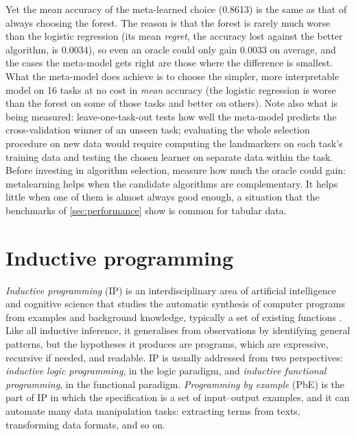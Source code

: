 Yet the mean accuracy of the meta-learned choice (0.8613) is the same as that of always choosing the
forest. The reason is that the forest is rarely much worse than the logistic regression (its
mean \emph{regret}, the accuracy lost against the better algorithm, is 0.0034), so even an oracle could
only gain 0.0033 on average, and the cases the meta-model gets right are those where the difference is
smallest. What the meta-model does achieve is to choose the simpler, more interpretable model on 16
tasks at no cost in \emph{mean} accuracy (the logistic regression is worse than the forest on some of
those tasks and better on others). Note also what is being measured: leave-one-task-out tests how well
the meta-model predicts the cross-validation winner of an unseen task; evaluating the whole selection
procedure on new data would require computing the landmarkers on each task's training data and testing
the chosen learner on separate data within the task. Before investing in algorithm selection, measure how much the oracle
could gain: metalearning helps when the candidate algorithms are complementary. It helps little when one of them
is almost always good enough, a situation that the benchmarks of \cref{sec:performance} show is common
for tabular data.

\section{Inductive programming\extsec}\label{sec:indprog}

\emph{Inductive programming} (IP) is an interdisciplinary area of artificial intelligence and
cognitive science that studies the automatic synthesis of computer programs from examples and
background knowledge, typically a set of existing functions
\citep{kitzelmann2009inductive,gulwani2015inductive}. Like all inductive inference, it generalises from
observations by identifying general patterns, but the hypotheses it produces are programs, which are
expressive, recursive if needed, and readable. IP is usually addressed from two perspectives:
\emph{inductive logic programming}, in the logic paradigm, and \emph{inductive functional programming},
in the functional paradigm. \emph{Programming by example} (PbE) is the part of IP in which the
specification is a set of input--output examples, and it can automate many data manipulation tasks:
extracting terms from texts, transforming data formats, and so on.

